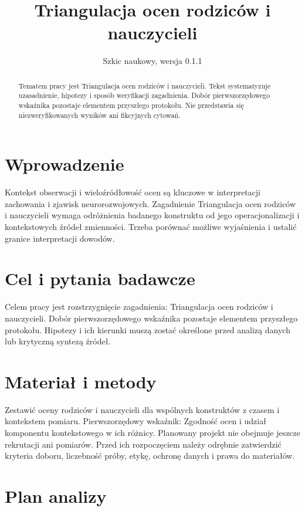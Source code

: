 \documentclass[11pt,a4paper]{article}
\title{Triangulacja ocen rodziców i nauczycieli}
\author{}
\date{Szkic naukowy, wersja 0.1.1}
\begin{document}
\maketitle

\begin{abstract}

Tematem pracy jest Triangulacja ocen rodziców i nauczycieli. Tekst systematyzuje uzasadnienie, hipotezy i sposób weryfikacji zagadnienia. Dobór pierwszorzędowego wskaźnika pozostaje elementem przyszłego protokołu. Nie przedstawia się niezweryfikowanych wyników ani fikcyjnych cytowań.

\end{abstract}

\section{Wprowadzenie}

Kontekst obserwacji i wieloźródłowość ocen są kluczowe w interpretacji zachowania i zjawisk neurorozwojowych. Zagadnienie Triangulacja ocen rodziców i nauczycieli wymaga odróżnienia badanego konstruktu od jego operacjonalizacji i kontekstowych źródeł zmienności. Trzeba porównać możliwe wyjaśnienia i ustalić granice interpretacji dowodów.

\section{Cel i pytania badawcze}

Celem pracy jest rozstrzygnięcie zagadnienia: Triangulacja ocen rodziców i nauczycieli. Dobór pierwszorzędowego wskaźnika pozostaje elementem przyszłego protokołu. Hipotezy i ich kierunki muszą zostać określone przed analizą danych lub krytyczną syntezą źródeł.

\section{Materiał i metody}

Zestawić oceny rodziców i nauczycieli dla wspólnych konstruktów z czasem i kontekstem pomiaru. Pierwszorzędowy wskaźnik: Zgodność ocen i udział komponentu kontekstowego w ich różnicy. Planowany projekt nie obejmuje jeszcze rekrutacji ani pomiarów. Przed ich rozpoczęciem należy odrębnie zatwierdzić kryteria doboru, liczebność próby, etykę, ochronę danych i prawa do materiałów.

\section{Plan analizy}
\end{document}
